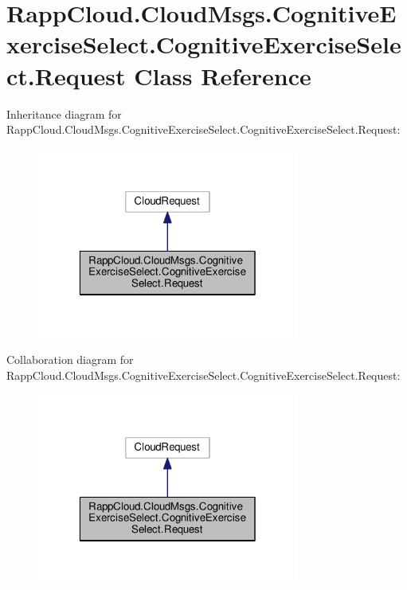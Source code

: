 \hypertarget{classRappCloud_1_1CloudMsgs_1_1CognitiveExerciseSelect_1_1CognitiveExerciseSelect_1_1Request}{\section{Rapp\-Cloud.\-Cloud\-Msgs.\-Cognitive\-Exercise\-Select.\-Cognitive\-Exercise\-Select.\-Request Class Reference}
\label{classRappCloud_1_1CloudMsgs_1_1CognitiveExerciseSelect_1_1CognitiveExerciseSelect_1_1Request}
}


Inheritance diagram for Rapp\-Cloud.\-Cloud\-Msgs.\-Cognitive\-Exercise\-Select.\-Cognitive\-Exercise\-Select.\-Request\-:
\nopagebreak
\begin{figure}[H]
\begin{center}
\leavevmode
\includegraphics[width=244pt]{classRappCloud_1_1CloudMsgs_1_1CognitiveExerciseSelect_1_1CognitiveExerciseSelect_1_1Request__inherit__graph}
\end{center}
\end{figure}


Collaboration diagram for Rapp\-Cloud.\-Cloud\-Msgs.\-Cognitive\-Exercise\-Select.\-Cognitive\-Exercise\-Select.\-Request\-:
\nopagebreak
\begin{figure}[H]
\begin{center}
\leavevmode
\includegraphics[width=244pt]{classRappCloud_1_1CloudMsgs_1_1CognitiveExerciseSelect_1_1CognitiveExerciseSelect_1_1Request__coll__graph}
\end{center}
\end{figure}
